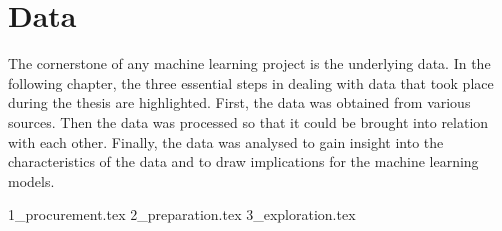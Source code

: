 \section{Data}

The cornerstone of any machine learning project is the underlying data. In the following chapter, the three essential steps in dealing with data that took place during the thesis are highlighted. First, the data was obtained from various sources. Then the data was processed so that it could be brought into relation with each other. Finally, the data was analysed to gain insight into the characteristics of the data and to draw implications for the machine learning models.

{1_procurement.tex}
{2_preparation.tex}
{3_exploration.tex}
